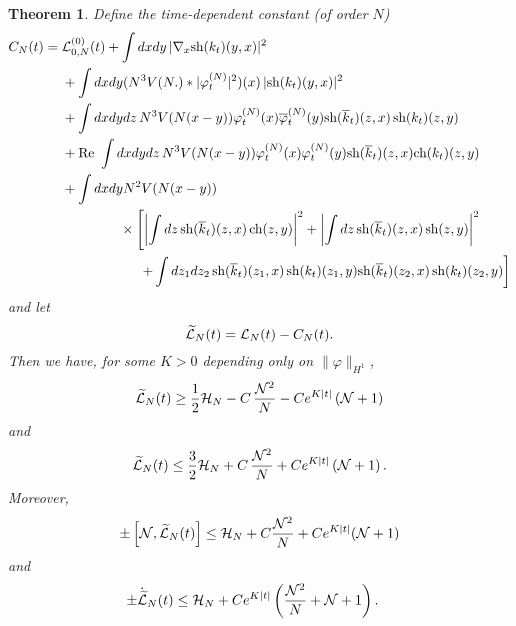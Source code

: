 \documentclass[11pt,a4paper]{article}
\newtheorem{thm}{Theorem}[section]  %
\newcommand{\ech}[2]{#2}	%
\newcommand{\ekt}{e^{K\lvert t\rvert}}	%
\newcommand{\wt}{\widetilde}
\newcommand{\cH}{{\cal H}}
\newcommand{\cL}{{\cal L}}
\newcommand{\cN}{{\cal N}}
\newcommand{\Ncal}{\mathcal{N}}		%
\newcommand{\norm}[1]{\lVert#1\rVert}	%
\begin{document}
\begin{thm}\label{thm:L}
Define the time-dependent constant (of order $N$)
\begin{equation}\label{eq:CNt} \begin{split} 
C_N (t) = \; &\cL^{(0)}_{0,N} (t) + \int dx dy \, |\nabla_x \text{sh} (k_t) (y,x)|^2  \\
 &+  \int dx dy (N^3 V(N.) * |\varphi_t^{(N)}|^2) (x) \, |\text{sh} (k_t) (y,x)|^2 \\
 &+ \int dx dy dz \, N^3 V(N (x-y)) \varphi_t^{(N)} (x) \overline{\varphi}_t^{(N)} (y) \text{sh} (\overline{k}_t) (z,x)  \, \text{sh} (k_t) (z,y)  \\
 &+ \text{Re } \int dx dy dz \, N^3 V(N (x-y)) \varphi_t^{(N)} (x) \varphi_t^{(N)} (y) \text{sh} (\overline{k}_t) (z,x) \text{ch} (k_t) (z,y)  \\
&+ \int dx dy N^2 V(N (x-y)) \\ &\hspace{1.5cm}  \times \left[ \left|\int dz \, \text{sh} (\overline{k}_t) (z,x) \, \text{ch} (z,y) \right|^2  + \left| \int dz \, \text{sh} (\overline{k}_t) (z,x) \, \text{sh} (z,y) \right|^2 \right. \\ &\hspace{2cm}  \left. 
+  \int dz_1 dz_2 \, \text{sh} (\overline{k}_t) (z_1,x) \, \text{sh} (k_t) (z_1,y)  \text{sh} (\overline{k}_t) (z_2,x) \, \text{sh} (k_t) (z_2,y) \right] 
\end{split} \end{equation}
and let
\begin{equation}\label{eq:wtcL} \wt{\cL}_N (t) = \cL_N (t) - C_N (t). \end{equation}
Then we have, for some $K > 0$ depending only on $\norm{\varphi}_{H^1}$,
\begin{equation}\label{eq:thmL-1} \wt{\cL}_N (t) \geq \frac{1}{2} \cH_N - C \, \frac{\cN^2}{N}  - C \ech{\| \varphi_t^{(N)} \|_{H^2}^2}{\ekt}  \left(\cN + 1\right) \end{equation}
and
\begin{equation}\label{eq:thmL-1b} \wt{\cL}_N (t) \leq \frac{3}{2} \cH_N + C \, \frac{\cN^2}{N}  +  C \ech{\| \varphi_t^{(N)} \|_{H^2}^2}{\ekt}  \left(\cN + 1\right). \end{equation}
Moreover, 
\begin{equation}\label{eq:thmL-2} \pm \left[ \cN , \wt{\cL}_N (t) \right]  \leq \cH_N + C \frac{\cN^2}{N} + C \ech{\| \varphi_t^{(N)} \|_{H^2}^2}{\ekt} (\cN+1) \end{equation}
and 
\begin{equation}\label{eq:thmL-3}
\begin{split} 
\pm \dot{\wt{\cL}}_N (t)  \leq \; &\cH_N + \ech{C \| \varphi_t^{(N)} \|_{H^4}^2 \, \frac{\cN^2}{N}  \\ &+ C \left( \| \varphi_t^{(N)} \|_{H^4}  \| \varphi_t^{(N)} \|_{H^2} + \| \varphi_t^{(N)} \|_{H^2}^3 \right) \left(\cN+1 \right)}{C \ekt \left(\frac{\Ncal^2}{N} + \Ncal + 1 \right)}.  
\end{split}
\end{equation}
\end{thm}
\end{document}
